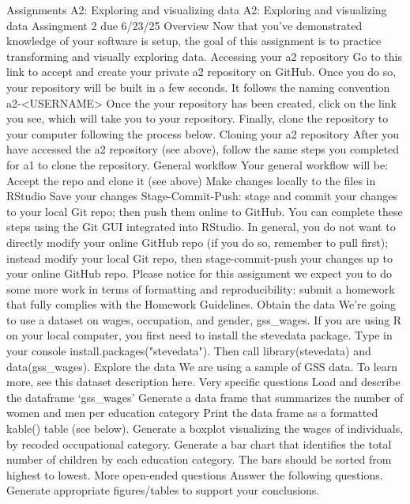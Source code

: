 \begin{userprompt}

Assignments
A2: Exploring and visualizing data
A2: Exploring and visualizing data
Assingment 2 due 6/23/25
Overview
Now that you’ve demonstrated knowledge of your software is setup, the goal of this assignment is to practice transforming and visually exploring data.
Accessing your a2 repository
Go to this link to accept and create your private a2 repository on GitHub. Once you do so, your repository will be built in a few seconds. It follows the naming convention a2-<USERNAME>
Once the your repository has been created, click on the link you see, which will take you to your repository.
Finally, clone the repository to your computer following the process below.
Cloning your a2 repository
After you have accessed the a2 repository (see above), follow the same steps you completed for a1 to clone the repository.
General workflow
Your general workflow will be:
Accept the repo and clone it (see above)
Make changes locally to the files in RStudio
Save your changes
Stage-Commit-Push: stage and commit your changes to your local Git repo; then push them online to GitHub. You can complete these steps using the Git GUI integrated into RStudio. In general, you do not want to directly modify your online GitHub repo (if you do so, remember to pull first); instead modify your local Git repo, then stage-commit-push your changes up to your online GitHub repo.
Please notice for this assignment we expect you to do some more work in terms of formatting and reproducibility: submit a homework that fully complies with the Homework Guidelines.
Obtain the data
We’re going to use a dataset on wages, occupation, and gender, gss\_wages.
If you are using R on your local computer, you first need to install the stevedata package. Type in your console install.packages("stevedata"). Then call library(stevedata) and data(gss\_wages).
Explore the data
We are using a sample of GSS data. To learn more, see this dataset description here.
Very specific questions
Load and describe the dataframe ‘gss\_wages’
Generate a data frame that summarizes the number of women and men per education category Print the data frame as a formatted kable() table (see below).
Generate a boxplot visualizing the wages of individuals, by recoded occupational category.
Generate a bar chart that identifies the total number of children by each education category. The bars should be sorted from highest to lowest.
More open-ended questions
Answer the following questions. Generate appropriate figures/tables to support your conclusions.

\end{userprompt}
